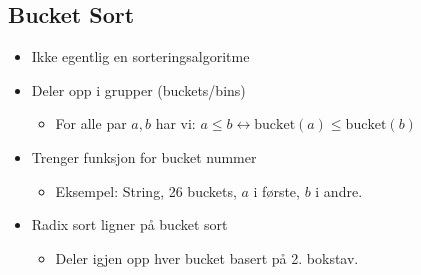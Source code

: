 \documentclass{article}
\begin{document}
    \subsection{Bucket Sort}
    \begin{itemize}
        \item Ikke egentlig en sorteringsalgoritme
            \item Deler opp i grupper (buckets/bins)
                \begin{itemize}
                    \item For alle par \( a,b \) har vi: \( a \leq b \leftrightarrow \text{bucket}(a) \leq \text{bucket}(b) \)
                \end{itemize}
                \item Trenger funksjon for bucket nummer
                    \begin{itemize}
                        \item Eksempel: String, 26 buckets, \( a \) i første, \( b \) i andre.
                    \end{itemize}
                    \item Radix sort ligner på bucket sort
                        \begin{itemize}
                            \item Deler igjen opp hver bucket basert på 2. bokstav.
                        \end{itemize}
    \end{itemize}
\end{document}
